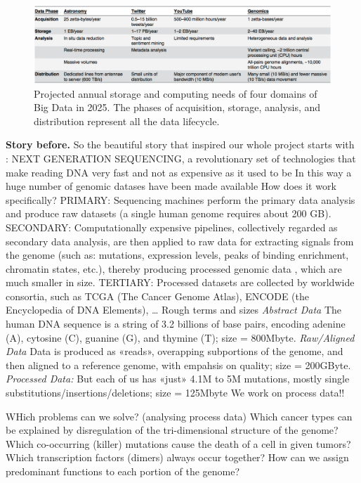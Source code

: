 \documentclass[journal]{IEEEtran}
\begin{document}
\begin{figure}
  \includegraphics[width=\textwidth]{astrogeno}
  \caption{Projected annual storage and computing needs of four domains of Big Data in 2025. The phases of acquisition, storage, analysis, and distribution represent all the data lifecycle.}
  \label{fig:astrogeno}
\end{figure}

\textbf{Story before.}
So the beautiful story that inspired our whole project starts with :
NEXT GENERATION SEQUENCING, a revolutionary set of technologies that make reading DNA very fast and not as expensive as it used to be In this way a huge number of genomic datases have been made available
How does it work specifically?
PRIMARY: Sequencing machines perform the primary data analysis  and produce raw datasets (a single human genome requires about 200 GB). 
SECONDARY: Computationally expensive pipelines, collectively regarded as secondary data analysis, are then applied to raw data for extracting signals from the genome (such as: mutations,
expression levels, peaks of binding enrichment, chromatin states, etc.), thereby producing processed genomic data , which are much smaller in size.
TERTIARY: Processed datasets are collected by worldwide consortia, such as TCGA (The Cancer Genome Atlas), ENCODE (the Encyclopedia of DNA Elements), …
Rough terms and sizes
\textit{Abstract Data}
The human DNA sequence is a string of 3.2 billions of base pairs, encoding adenine (A), cytosine (C), guanine (G), and thymine (T); size = 800Mbyte.
\textit{Raw/Aligned Data} 
Data is produced as «reads», overapping subportions of the genome, and then aligned to a reference genome, with empahsis on quality; size = 200GByte. 
\textit{Processed Data:}
But each of us has «just» 4.1M to 5M mutations, mostly single substitutions/insertions/deletions; size = 125Mbyte
We work on process data!!

WHich problems can we solve? (analysing process data)
Which cancer types can be explained by disregulation of the tri-dimensional structure of the genome?
Which co-occurring (killer) mutations cause the death of a cell in given tumors?
Which transcription factors (dimers) always occur together?
How can we assign predominant functions to each portion of the genome?
\end{document}
